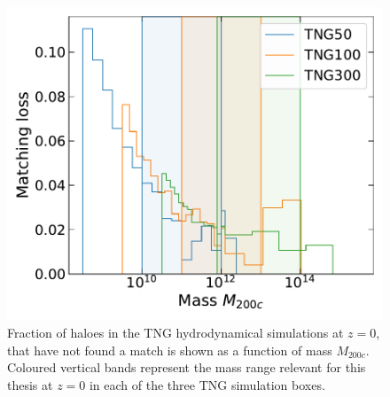 \begin{figure}
    \centering
    \includegraphics[width=\linewidth]{plots/hal_match_efficiency_mass_all.pdf}
    \caption{Fraction of haloes in the TNG hydrodynamical simulations at $z=0$, that have not found a match is shown as a function of mass $M_{200c}$. Coloured vertical bands represent the mass range relevant for this thesis at $z=0$ in each of the three TNG simulation boxes.}
    \label{fig:matching-loss-all-ch:sims}
\end{figure}

